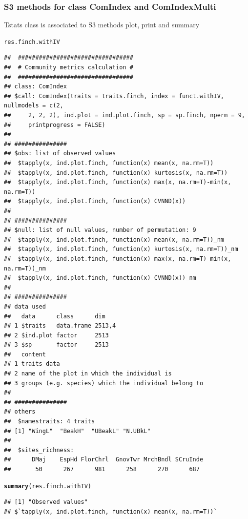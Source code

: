 \documentclass[12pt]{article}\usepackage[]{graphicx}\usepackage[]{color}
\makeatletter
\newcommand{\hlstd}[1]{\textcolor[rgb]{0.345,0.345,0.345}{#1}}%
\newcommand{\hlkwd}[1]{\textcolor[rgb]{0.737,0.353,0.396}{\textbf{#1}}}%
\newenvironment{kframe}{%
 \def\at@end@of@kframe{}%
 \ifinner\ifhmode%
  \def\at@end@of@kframe{\end{minipage}}%
  \begin{minipage}{\columnwidth}%
 \fi\fi%
 \def\FrameCommand##1{\hskip\@totalleftmargin \hskip-\fboxsep
 \colorbox{shadecolor}{##1}\hskip-\fboxsep
     \hskip-\linewidth \hskip-\@totalleftmargin \hskip\columnwidth}%
 \MakeFramed {\advance\hsize-\width
   \@totalleftmargin\z@ \linewidth\hsize
   \@setminipage}}%
 {\par\unskip\endMakeFramed%
 \at@end@of@kframe}
\newenvironment{knitrout}{}{} %
\makeatother
\begin{document}
\subsubsection{S3 methods for class ComIndex and ComIndexMulti}
Tstats class is associated to S3 methods plot, print and summary

\begin{knitrout}
\color{fgcolor}\begin{kframe}
\begin{alltt}
\hlstd{res.finch.withIV}
\end{alltt}
\begin{verbatim}
## 	#################################
## 	# Community metrics calculation #
## 	#################################
## class: ComIndex
## $call: ComIndex(traits = traits.finch, index = funct.withIV, nullmodels = c(2, 
##     2, 2, 2), ind.plot = ind.plot.finch, sp = sp.finch, nperm = 9, 
##     printprogress = FALSE)
## 
## ###############
## $obs: list of observed values
## 	$tapply(x, ind.plot.finch, function(x) mean(x, na.rm=T))
## 	$tapply(x, ind.plot.finch, function(x) kurtosis(x, na.rm=T))
## 	$tapply(x, ind.plot.finch, function(x) max(x, na.rm=T)-min(x, na.rm=T))
## 	$tapply(x, ind.plot.finch, function(x) CVNND(x))
## 
## ###############
## $null: list of null values, number of permutation: 9 
## 	$tapply(x, ind.plot.finch, function(x) mean(x, na.rm=T))_nm
## 	$tapply(x, ind.plot.finch, function(x) kurtosis(x, na.rm=T))_nm
## 	$tapply(x, ind.plot.finch, function(x) max(x, na.rm=T)-min(x, na.rm=T))_nm
## 	$tapply(x, ind.plot.finch, function(x) CVNND(x))_nm
## 
## ###############
## data used
##   data      class      dim   
## 1 $traits   data.frame 2513,4
## 2 $ind.plot factor     2513  
## 3 $sp       factor     2513  
##   content                                             
## 1 traits data                                         
## 2 name of the plot in which the individual is         
## 3 groups (e.g. species) which the individual belong to
## 
## ###############
## others
## 	$namestraits: 4 traits
## [1] "WingL"  "BeakH"  "UBeakL" "N.UBkL"
## 
## 	$sites_richness:
## 	    DMaj    EspHd FlorChrl  GnovTwr MrchBndl SCruInde 
##       50      267      981      258      270      687
\end{verbatim}
\begin{alltt}
\hlkwd{summary}\hlstd{(res.finch.withIV)}
\end{alltt}
\begin{verbatim}
## [1] "Observed values"
## $`tapply(x, ind.plot.finch, function(x) mean(x, na.rm=T))`

\end{verbatim}
\end{kframe}
\end{knitrout}
\end{document}
